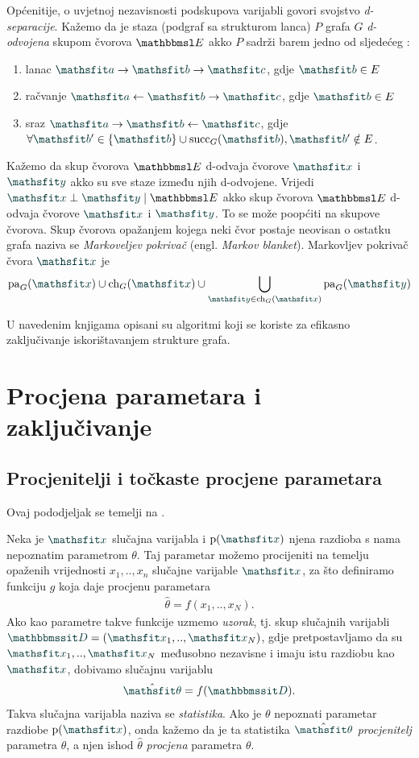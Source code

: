 \documentclass[utf8, diplomski, lmodern]{fer}
\begin{document}
Općenitije, o uvjetnoj nezavisnosti podskupova varijabli govori svojstvo \emph{d-separacije}. Kažemo da je staza (podgraf sa strukturom lanca) $P$ grafa $G$ \emph{d-odvojena} skupom čvorova $\set E$ akko $P$ sadrži barem jedno od sljedećeg \citep{Murphy:2012:MLPP}:
\begin{enumerate}
	\item lanac $\rvar a\rightarrow\rvar b\rightarrow\rvar c$, gdje $\rvar b\in E$
	\item račvanje $\rvar a\leftarrow\rvar b\rightarrow\rvar c$, gdje $\rvar b\in E$
	\item sraz $\rvar a\rightarrow\rvar b\leftarrow\rvar c$, gdje $\forall \rvar b'\in\cbr{\rvar b}\cup\succ_G(\rvar b), \rvar b'\notin E$.
\end{enumerate}
Kažemo da skup čvorova $\set E$ d-odvaja čvorove $\rvar x$ i $\rvar y$ akko su sve staze između njih d-odvojene. Vrijedi $\rvar x\perp\rvar y \mid \set E$ akko skup čvorova $\set E$ d-odvaja čvorove $\rvar x$ i $\rvar y$. To se može poopćiti na skupove čvorova. Skup čvorova opažanjem kojega neki čvor postaje neovisan o ostatku grafa naziva se \emph{Markoveljev pokrivač} (engl. \textit{Markov blanket}). Markovljev pokrivač čvora $\rvar x$ je
\begin{align}
\pa_G(\rvar x)\cup\ch_G(\rvar x)\cup\bigcup_{\rvar y\in\ch_G(\rvar x)}\pa_G(\rvar y)
\end{align}

U navedenim knjigama opisani su algoritmi koji se koriste za efikasno zaključivanje iskorištavanjem strukture grafa.


\section{Procjena parametara i zaključivanje}

\subsection{Procjenitelji i točkaste procjene parametara}

Ovaj pododjeljak se temelji na \citet{Elezovic:2007:VSSV}.

Neka je $\rvar x$ slučajna varijabla i $\p(\rvar x)$ njena razdioba s nama nepoznatim parametrom $\theta$. Taj parametar možemo procijeniti na temelju opaženih vrijednosti $x_1,..,x_n$ slučajne varijable $\rvar x$, za što definiramo funkciju $g$ koja daje procjenu parametara
\begin{align}
\hat{\theta}=f(x_1,..,x_N) \text{.}
\end{align}
Ako kao parametre takve funkcije uzmemo \emph{uzorak}, tj. skup slučajnih varijabli $\rset D=\del{\rvar x_1,..,\rvar x_N}$, gdje pretpostavljamo da su $\rvar x_1,..,\rvar x_N$ međusobno nezavisne i imaju istu razdiobu kao $\rvar x$, dobivamo slučajnu varijablu
\begin{align}
\hat{\rvar\theta}=f(\rset D) \text{.}
\end{align}
Takva slučajna varijabla naziva se \emph{statistika}. Ako je $\theta$ nepoznati parametar razdiobe $\p(\rvar x)$, onda kažemo da je ta statistika $\hat{\rvar\theta}$ \emph{procjenitelj} parametra $\theta$, a njen ishod $\hat{\theta}$ \emph{procjena} parametra $\theta$.
\end{document}
